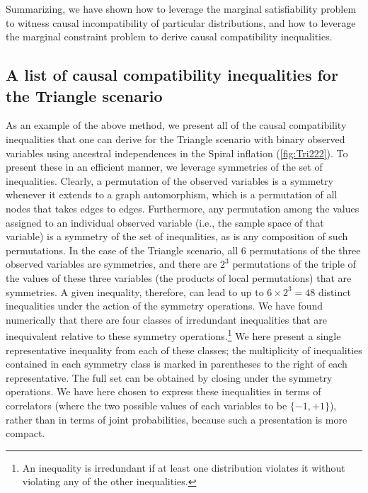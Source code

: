 \documentclass[aps,english,10pt,superscriptaddress,onecolumn,twoside,longbibliography,pra,floatfix,fleqn,nofootinbib]{revtex4-1}%
\theoremstyle{definition}
\newcounter{example}[section]
\begin{document}
Summarizing, we have shown how to leverage the marginal satisfiability problem to witness causal incompatibility of particular distributions, and how to leverage the marginal constraint problem to derive causal compatibility inequalities.


\subsection{A list of causal compatibility inequalities for the Triangle scenario}
\label{sec:CCineqs}

As an example of the above method, we present all of the causal compatibility inequalities that one can derive for the Triangle scenario with binary observed variables using ancestral independences in the Spiral inflation (\cref{fig:Tri222}). 
 To present these in an efficient manner, we leverage symmetries of the set of inequalities.  
Clearly, a permutation of the observed variables is a symmetry whenever it extends
to a graph automorphism, which is a permutation of all nodes that takes edges to edges. Furthermore, any permutation among the values assigned to an individual observed variable (i.e., the sample space of that variable) is a symmetry of the set of inequalities, as is any composition of such permutations. 
In the case of the Triangle scenario, all 6 permutations of the three observed variables are symmetries, and there are $2^3$ permutations of the triple of the values of these three variables (the products of local permutations) that are symmetries.  A given inequality, therefore, can lead to up to $6\times 2^3 = 48$ distinct inequalities under the action of the symmetry operations. We have found numerically that there are four classes of irredundant inequalities that are inequivalent relative to these symmetry operations.\footnote{An inequality is irredundant if at least one distribution violates it without violating any of the other inequalities.} We here present a single representative inequality from each of these classes; the multiplicity of inequalities contained in each symmetry class is marked in parentheses to the right of each representative. The full set can be obtained by closing under the symmetry operations.  We have here chosen to express these inequalities in terms of correlators (where the two possible values of each variables to be $\{-1,+1\}$), rather than in terms of joint probabilities, because such a presentation is more compact.
\end{document}
